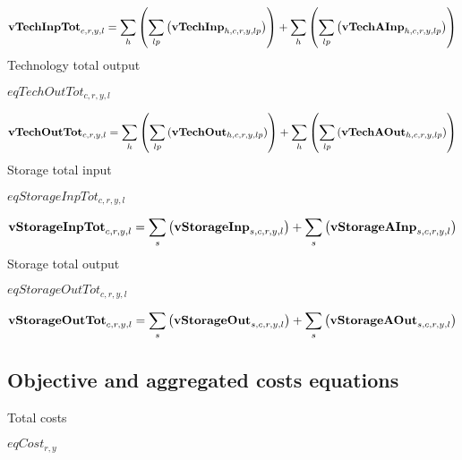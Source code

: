 \documentclass{article}
\begin{document}
\begin{dmath} 
{\bf vTechInpTot}_{c,r,y,l}  =  \sum_{h}{\left(\sum_{lp}{\left({\bf vTechInp}_{h,c,r,y,lp}\right)}\right)}+\sum_{h}{\left(\sum_{lp}{\left({\bf vTechAInp}_{h,c,r,y,lp}\right)}\right)}
\end{dmath} 
Technology total output







$eqTechOutTot_{c,r,y,l}$





\begin{dmath} 
{\bf vTechOutTot}_{c,r,y,l}  =  \sum_{h}{\left(\sum_{lp}{\left({\bf vTechOut}_{h,c,r,y,lp}\right)}\right)}+\sum_{h}{\left(\sum_{lp}{\left({\bf vTechAOut}_{h,c,r,y,lp}\right)}\right)}
\end{dmath} 
Storage total input







$eqStorageInpTot_{c,r,y,l}$





\begin{dmath} 
{\bf vStorageInpTot}_{c,r,y,l}  =  \sum_{s}{\left({\bf vStorageInp}_{s,c,r,y,l}\right)}+\sum_{s}{\left({\bf vStorageAInp}_{s,c,r,y,l}\right)}
\end{dmath} 
Storage total output







$eqStorageOutTot_{c,r,y,l}$





\begin{dmath} 
{\bf vStorageOutTot}_{c,r,y,l}  =  \sum_{s}{\left({\bf vStorageOut}_{s,c,r,y,l}\right)}+\sum_{s}{\left({\bf vStorageAOut}_{s,c,r,y,l}\right)}
\end{dmath} 
\subsection*{Objective and aggregated costs equations}
Total costs







$eqCost_{r,y}$
\end{document}
